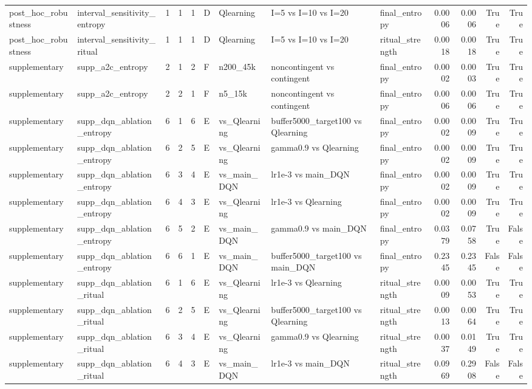 \begin{tabular}{llrrrllllrrrr}
post_hoc_robustness & interval_sensitivity_entropy & 1 & 1 & 1 & D & Qlearning & I=5 vs I=10 vs I=20 & final_entropy & 0.0006 & 0.0006 & True & True \\
post_hoc_robustness & interval_sensitivity_ritual & 1 & 1 & 1 & D & Qlearning & I=5 vs I=10 vs I=20 & ritual_strength & 0.0018 & 0.0018 & True & True \\
supplementary & supp_a2c_entropy & 2 & 1 & 2 & F & n200_45k & noncontingent vs contingent & final_entropy & 0.0002 & 0.0003 & True & True \\
supplementary & supp_a2c_entropy & 2 & 2 & 1 & F & n5_15k & noncontingent vs contingent & final_entropy & 0.0006 & 0.0006 & True & True \\
supplementary & supp_dqn_ablation_entropy & 6 & 1 & 6 & E & vs_Qlearning & buffer5000_target100 vs Qlearning & final_entropy & 0.0002 & 0.0009 & True & True \\
supplementary & supp_dqn_ablation_entropy & 6 & 2 & 5 & E & vs_Qlearning & gamma0.9 vs Qlearning & final_entropy & 0.0002 & 0.0009 & True & True \\
supplementary & supp_dqn_ablation_entropy & 6 & 3 & 4 & E & vs_main_DQN & lr1e-3 vs main_DQN & final_entropy & 0.0002 & 0.0009 & True & True \\
supplementary & supp_dqn_ablation_entropy & 6 & 4 & 3 & E & vs_Qlearning & lr1e-3 vs Qlearning & final_entropy & 0.0002 & 0.0009 & True & True \\
supplementary & supp_dqn_ablation_entropy & 6 & 5 & 2 & E & vs_main_DQN & gamma0.9 vs main_DQN & final_entropy & 0.0379 & 0.0758 & True & False \\
supplementary & supp_dqn_ablation_entropy & 6 & 6 & 1 & E & vs_main_DQN & buffer5000_target100 vs main_DQN & final_entropy & 0.2345 & 0.2345 & False & False \\
supplementary & supp_dqn_ablation_ritual & 6 & 1 & 6 & E & vs_Qlearning & lr1e-3 vs Qlearning & ritual_strength & 0.0009 & 0.0053 & True & True \\
supplementary & supp_dqn_ablation_ritual & 6 & 2 & 5 & E & vs_Qlearning & buffer5000_target100 vs Qlearning & ritual_strength & 0.0013 & 0.0064 & True & True \\
supplementary & supp_dqn_ablation_ritual & 6 & 3 & 4 & E & vs_Qlearning & gamma0.9 vs Qlearning & ritual_strength & 0.0037 & 0.0149 & True & True \\
supplementary & supp_dqn_ablation_ritual & 6 & 4 & 3 & E & vs_main_DQN & lr1e-3 vs main_DQN & ritual_strength & 0.0969 & 0.2908 & False & False \\

\end{tabular}
